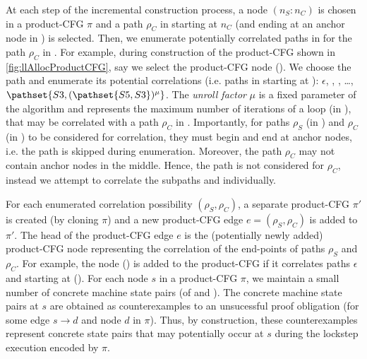 At each step of the incremental construction process, a node $(n_S\!:\!n_C)$ is chosen in a product-CFG $\pi$
and a path $\rho_C$ in \cprog{} starting at $n_C$ (and ending at an anchor node in \cprog{}) is selected.
Then, we enumerate potentially correlated paths in \sprog{} for the path $\rho_C$ in \cprog{}.
For example, during construction of the product-CFG shown in \cref{fig:llAllocProductCFG},
say we select the product-CFG node ().
We choose the \cprog{} path  and enumerate its potential correlations (i.e. paths in \sprog{} starting at ):
$\epsilon$, , , \ldots, $\pathset{S3,(\pathset{S5,S3})^\mu}$.
The {\em unroll factor} $\mu$ is a fixed parameter of the algorithm and represents the maximum number of iterations of a loop (in \sprog{}),
that may be correlated with a path $\rho_C$ in \cprog{}.
Importantly, for paths $\rho_S$ (in \sprog{}) and $\rho_C$ (in \cprog{}) to be considered for correlation,
they must begin and end at anchor nodes, i.e. the path  is skipped during enumeration.
Moreover, the path $\rho_C$ may not contain anchor nodes in the middle.
Hence, the path  is not considered for $\rho_C$,
instead we attempt to correlate the subpaths  and  individually.

For each enumerated correlation possibility $(\rho_S,\rho_C)$, a separate product-CFG $\pi'$ is
created (by cloning $\pi$) and a new product-CFG edge $e=(\rho_S,\rho_C)$ is added to $\pi'$.
The head of the product-CFG edge $e$ is the (potentially newly added) product-CFG node representing
the correlation of the end-points of paths $\rho_S$ and $\rho_C$. For example, the node () is added
to the product-CFG if it correlates paths $\epsilon$ and  starting at ().
For each node $s$ in a product-CFG $\pi$, we maintain a small number of
concrete machine state pairs (of \sprog{} and \cprog{}).
The concrete machine state pairs at $s$ are obtained as counterexamples to an unsucessful proof
obligation  (for some edge $s \rightarrow d$ and node $d$ in $\pi$).
Thus, by construction, these counterexamples represent concrete state pairs that may potentially occur
at $s$ during the lockstep execution encoded by $\pi$.

